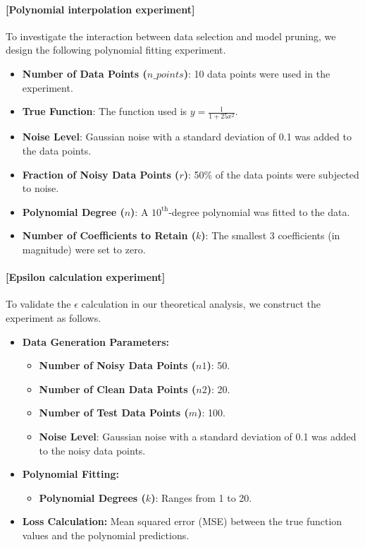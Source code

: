 \paragraph{[Polynomial interpolation experiment]} To investigate the interaction between data selection and model pruning, we design the following polynomial fitting experiment.
\begin{itemize}
    \item \textbf{Number of Data Points (\(n\_points\))}: 10 data points were used in the experiment.
    \item \textbf{True Function}: The function used is \( y = \frac{1}{1 + 25x^2} \).
    \item \textbf{Noise Level}: Gaussian noise with a standard deviation of 0.1 was added to the data points.
    \item \textbf{Fraction of Noisy Data Points (\(r\))}: 50\% of the data points were subjected to noise.
    \item \textbf{Polynomial Degree (\(n\))}: A \(10^{\text{th}}\)-degree polynomial was fitted to the data.
    \item \textbf{Number of Coefficients to Retain (\(k\))}: The smallest 3 coefficients (in magnitude) were set to zero.
\end{itemize}

\paragraph{[Epsilon calculation experiment]}
To validate the \(\epsilon\) calculation in our theoretical analysis, we construct the experiment as follows.
\begin{itemize}
    \item \textbf{Data Generation Parameters:}
    \begin{itemize}
        \item \textbf{Number of Noisy Data Points (\(n1\))}: 50.
        \item \textbf{Number of Clean Data Points (\(n2\))}: 20.
        \item \textbf{Number of Test Data Points (\(m\))}: 100.
        \item \textbf{Noise Level}: Gaussian noise with a standard deviation of 0.1 was added to the noisy data points.
    \end{itemize}
    \item \textbf{Polynomial Fitting:}
    \begin{itemize}
        \item \textbf{Polynomial Degrees (\(k\))}: Ranges from 1 to 20.
    \end{itemize}
    \item \textbf{Loss Calculation:} Mean squared error (MSE) between the true function values and the polynomial predictions.
\end{itemize}

